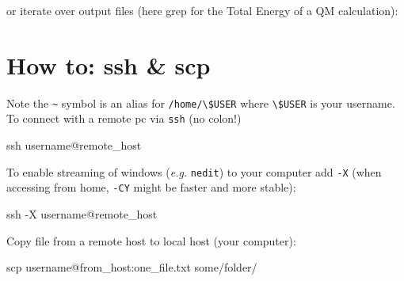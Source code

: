 \documentclass[
  letterpaper,
]{article}
\newenvironment{Shaded}{\begin{snugshade}}{\end{snugshade}}
\newcommand{\AttributeTok}[1]{\textcolor[rgb]{0.40,0.45,0.13}{#1}}
\newcommand{\ControlFlowTok}[1]{\textcolor[rgb]{0.00,0.23,0.31}{#1}}
\newcommand{\FunctionTok}[1]{\textcolor[rgb]{0.28,0.35,0.67}{#1}}
\newcommand{\KeywordTok}[1]{\textcolor[rgb]{0.00,0.23,0.31}{#1}}
\newcommand{\NormalTok}[1]{\textcolor[rgb]{0.00,0.23,0.31}{#1}}
\newcommand{\PreprocessorTok}[1]{\textcolor[rgb]{0.68,0.00,0.00}{#1}}
\newcommand{\StringTok}[1]{\textcolor[rgb]{0.13,0.47,0.30}{#1}}
\newcommand{\VariableTok}[1]{\textcolor[rgb]{0.07,0.07,0.07}{#1}}
\begin{document}
or iterate over output files (here grep for the Total Energy of a QM
calculation):

\begin{Shaded}
\end{Shaded}

\hypertarget{how-to-ssh-scp}{%
\section*{How to: ssh \& scp}\label{how-to-ssh-scp}}


Note the \texttt{\textasciitilde{}} symbol is an alias for
\texttt{/home/\textbackslash{}\$USER} where
\texttt{\textbackslash{}\$USER} is your username. To connect with a
remote pc via \texttt{ssh} (no colon!)

\begin{Shaded}
\begin{Highlighting}[]

\NormalTok{ssh username@remote\_host  }
\end{Highlighting}
\end{Shaded}

To enable streaming of windows (\emph{e.g.} \texttt{nedit}) to your
computer add \texttt{-X} (when accessing from home, \texttt{-CY} might
be faster and more stable):

\begin{Shaded}
\begin{Highlighting}[]
\FunctionTok{ssh} \AttributeTok{{-}X}\NormalTok{ username@remote\_host  }
\end{Highlighting}
\end{Shaded}

Copy file from a remote host to local host (your computer):

\begin{Shaded}
\begin{Highlighting}[]
\FunctionTok{scp}\NormalTok{   username@from\_host:one\_file.txt   some/folder/}
\end{Highlighting}
\end{Shaded}
\end{document}
